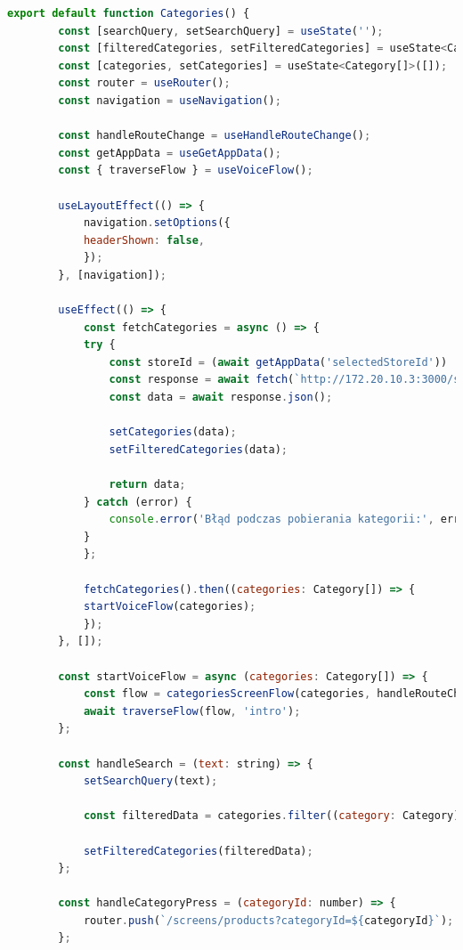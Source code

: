 \begin{lstlisting}[language=JavaScript, caption=Ekran kategorii implementacja, label=lst:view]
    export default function Categories() {
        const [searchQuery, setSearchQuery] = useState('');
        const [filteredCategories, setFilteredCategories] = useState<Category[]>([]);
        const [categories, setCategories] = useState<Category[]>([]);
        const router = useRouter();
        const navigation = useNavigation();

        const handleRouteChange = useHandleRouteChange();
        const getAppData = useGetAppData();
        const { traverseFlow } = useVoiceFlow();

        useLayoutEffect(() => {
            navigation.setOptions({
            headerShown: false,
            });
        }, [navigation]);

        useEffect(() => {
            const fetchCategories = async () => {
            try {
                const storeId = (await getAppData('selectedStoreId')) || 1;
                const response = await fetch(`http://172.20.10.3:3000/stores/${storeId}/categories`);
                const data = await response.json();

                setCategories(data);
                setFilteredCategories(data);

                return data;
            } catch (error) {
                console.error('Błąd podczas pobierania kategorii:', error);
            }
            };

            fetchCategories().then((categories: Category[]) => {
            startVoiceFlow(categories);
            });
        }, []);

        const startVoiceFlow = async (categories: Category[]) => {
            const flow = categoriesScreenFlow(categories, handleRouteChange, router);
            await traverseFlow(flow, 'intro');
        };

        const handleSearch = (text: string) => {
            setSearchQuery(text);

            const filteredData = categories.filter((category: Category) => category.category_name.toLowerCase().includes(text.toLowerCase()));

            setFilteredCategories(filteredData);
        };

        const handleCategoryPress = (categoryId: number) => {
            router.push(`/screens/products?categoryId=${categoryId}`);
        };


\end{lstlisting}
